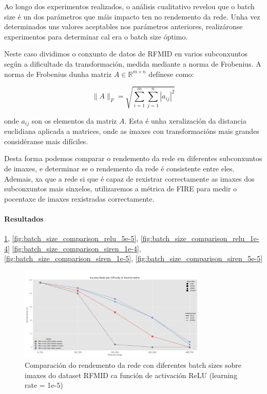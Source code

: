 Ao longo dos experimentos realizados, o análisis cualitativo revelou que o batch size é un dos parámetros que máis impacto ten no rendemento da rede.
Unha vez determinados uns valores aceptables nos parámetros anteriores, realizáronse experimentos para determinar cal era o batch size óptimo.

Neste caso dividimos o conxunto de datos de RFMID en varios subconxuntos según a dificultade da transformación, medida mediante a norma de Frobenius.
A norma de Frobenius dunha matriz $A \in \mathbb{R}^{m \times n}$ defínese como:

\[
\|A\|_F = \sqrt{\sum_{i=1}^{m} \sum_{j=1}^{n} |a_{ij}|^2}
\]

onde $a_{ij}$ son os elementos da matriz $A$.
Esta é unha xeralización da distancia euclidiana aplicada a matrices, onde as imaxes con transformacións mais grandes considéranse mais difíciles.

Desta forma podemos comparar o rendemento da rede en diferentes subconxuntos de imaxes, e determinar se o rendemento da rede é consistente entre eles.
Ademais, xa que a rede si que é capaz de rexistrar correctamente as imaxes dos subconxuntos mais sinxelos, utilizaremos a métrica de FIRE para medir o pocentaxe de imaxes rexistradas correctamente.

\paragraph{Resultados}
\label{par:Resultados}

\ref{fig:batch_size_comparison_relu_1e-5}, \ref{fig:batch_size_comparison_relu_5e-5}, \ref{fig:batch_size_comparison_relu_1e-4}
\ref{fig:batch_size_comparison_siren_1e-4}, \ref{fig:batch_size_comparison_siren_1e-5}, \ref{fig:batch_size_comparison_siren_5e-5}

\begin{figure}[ht] 
    \centering
    \includegraphics[width=0.8\textwidth]{imaxes/batchsize/experiment_plot_RFMID_MLP_1e-05.png}
    \caption{Comparación do rendemento da rede con diferentes batch sizes sobre imaxes do dataset RFMID ca función de activación ReLU (learning rate = 1e-5)}
    \label{fig:batch_size_comparison_relu_1e-5}
\end{figure}

